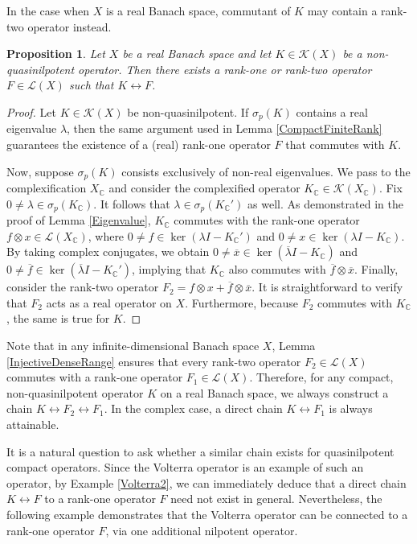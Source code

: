 \documentclass[a4paper,12pt]{article}
\newtheorem{prop}[thm]{Proposition}
\theoremstyle{definition}
\numberwithin{equation}{section}
\numberwithin{thm}{section}
\newcommand{\C}{\mathbb{C}}
\begin{document}
In the case when $X$ is a real Banach space, commutant of $K$ may contain a rank-two operator instead.

\begin{prop}
\label{CompactFiniteRank2}
Let $X$ be a real Banach space and let $K\in \mathcal{K}(X)$ be a non-quasinilpotent operator. Then there exists a rank-one or rank-two operator $F\in \mathcal{L}(X)$ such that $K\leftrightarrow F$. 
\end{prop}

\begin{proof}
Let $K\in \mathcal{K}(X)$ be non-quasinilpotent. If $\sigma_p(K)$ contains a real eigenvalue $\lambda$, then the same argument used in Lemma \ref{CompactFiniteRank} guarantees the existence of a (real) rank-one operator $F$ that commutes with $K$.

Now, suppose $\sigma_p(K)$ consists exclusively of non-real eigenvalues. We pass to the complexi\-fication $X_\C$ and consider the complexified operator $K_\C \in \mathcal{K}(X_\C)$. Fix $0\neq \lambda \in \sigma_p(K_\C)$. It follows that $\lambda \in \sigma_p(K_\C')$ as well. As demonstrated in the proof of Lemma \ref{Eigenvalue}, $K_\C$ commutes with the rank-one operator $f\otimes x\in \mathcal{L}(X_\C)$, where $0\neq f\in \ker(\lambda I - K_\C')$ and $0\neq x\in \ker(\lambda I - K_\C)$. By taking complex conjugates, we obtain $0\neq \overline{x}\in \ker(\overline{\lambda} I - K_\C)$ and $0\neq \overline{f} \in \ker(\overline{\lambda} I - K_\C')$, implying that $K_\C$ also commutes with $\overline{f}\otimes \overline{x}$. Finally, consider the rank-two operator $F_2 = f\otimes x + \overline{f}\otimes \overline{x}$. It is straightforward to verify that $F_2$ acts as a real operator on $X$. Furthermore, because $F_2$ commutes with $K_\C$, the same is true for $K$.
\end{proof}

Note that in any infinite-dimensional Banach space $X$, Lemma \ref{InjectiveDenseRange} ensures that every rank-two operator $F_2\in \mathcal{L}(X)$ commutes with a rank-one operator $F_1\in \mathcal{L}(X)$. Therefore, for any compact, non-quasinilpotent operator $K$ on a real Banach space, we always construct a chain $K \leftrightarrow F_2 \leftrightarrow F_1$. In the complex case, a direct chain $K \leftrightarrow F_1$ is always attainable.

It is a natural question to ask whether a similar chain exists for quasinilpotent compact operators. Since the Volterra operator is an example of such an operator, by Example \ref{Volterra2}, we can immediately deduce that a direct chain $K \leftrightarrow F$ to a rank-one operator $F$ need not exist in general. Nevertheless, the following example demonstrates that the Volterra operator can be connected to a rank-one operator $F$, via one additional nilpotent operator.
\end{document}

